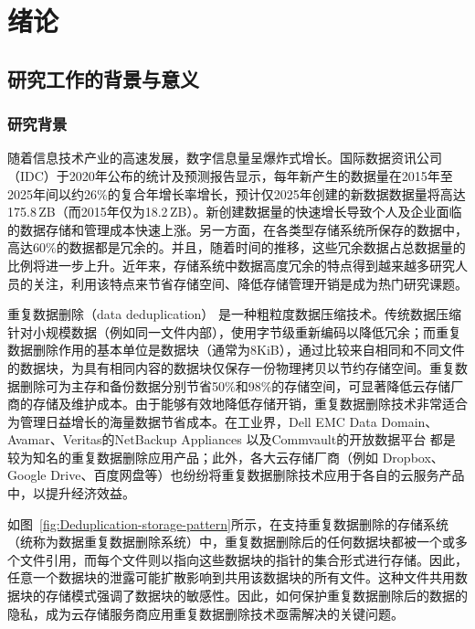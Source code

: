 \chapter{绪\hspace{6pt}论}

\section{研究工作的背景与意义}
\subsection{研究背景}

随着信息技术产业的高速发展，数字信息量呈爆炸式增长。国际数据资讯公司（IDC）\cite{IDC}于2020年公布的统计及预测报告\cite{DataReport2020}显示，每年新产生的数据量在2015年至2025年间以约26\%的复合年增长率增长，预计仅2025年创建的新数据数据量将高达175.8\,ZB（而2015年仅为18.2\,ZB）。新创建数据量的快速增长导致个人及企业面临的数据存储和管理成本快速上涨\cite{敖莉2010重复数据删除技术}。另一方面，在各类型存储系统所保存的数据中，高达60\%的数据都是冗余的。并且，随着时间的推移，这些冗余数据占总数据量的比例将进一步上升\cite{mcknight2006digital}。近年来，存储系统中数据高度冗余的特点得到越来越多研究人员的关注，利用该特点来节省存储空间、降低存储管理开销是成为热门研究课题。

重复数据删除（data deduplication）\cite{2012重复数据删除关键技术研究进展, 敖莉2010重复数据删除技术,xia16,Paulo2014} 是一种粗粒度数据压缩技术。传统数据压缩针对小规模数据（例如同一文件内部），使用字节级重新编码以降低冗余；而重复数据删除作用的基本单位是数据块（通常为8KiB），通过比较来自相同和不同文件的数据块，为具有相同内容的数据块仅保存一份物理拷贝以节约存储空间。重复数据删除可为主存和备份数据分别节省50\%\cite{meyer11}和98\%\cite{wallace12}的存储空间，可显著降低云存储厂商的存储及维护成本\cite{2012重复数据删除关键技术研究进展}。由于能够有效地降低存储开销，重复数据删除技术非常适合为管理日益增长的海量数据节省成本。在工业界，Dell EMC Data Domain\cite{EMCDataDomain}、Avamar\cite{Avamar}、Veritas的NetBackup Appliances\cite{veritas} 以及Commvault的开放数据平台\cite{CommVault} 都是较为知名的重复数据删除应用产品；此外，各大云存储厂商（例如 Dropbox\cite{Dropbox}、Google Drive\cite{GoogleDrive}、百度网盘\cite{BaiduPan}等）也纷纷将重复数据删除技术应用于各自的云服务产品中，以提升经济效益\cite{harnik2010side}。  

如图~\ref{fig:Deduplication-storage-pattern}所示，在支持重复数据删除的存储系统（统称为数据重复数据删除系统）中，重复数据删除后的任何数据块都被一个或多个文件引用，而每个文件则以指向这些数据块的指针的集合形式进行存储。因此，任意一个数据块的泄露可能扩散影响到共用该数据块的所有文件。这种文件共用数据块的存储模式强调了数据块的敏感性。因此，如何保护重复数据删除后的数据的隐私，成为云存储服务商应用重复数据删除技术亟需解决的关键问题。

